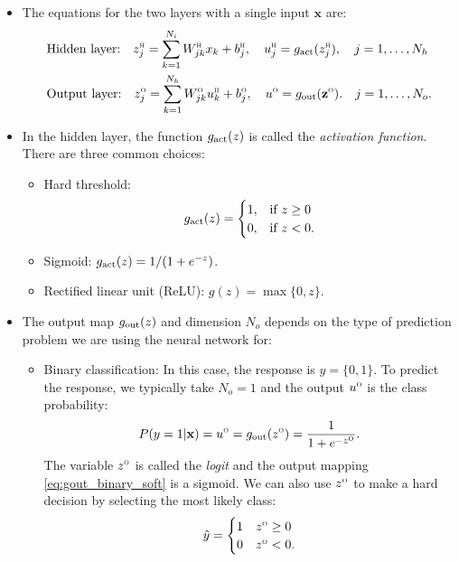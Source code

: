 \documentclass[11pt]{article}
\def\beq{\begin{equation}}
\def\eeq{\end{equation}}
\newcommand{\xbf}{\mathbf{x}}
\newcommand{\zbf}{\mathbf{z}}
\def\hid{\textsc{\tiny H}}
\def\out{\textsc{\tiny O}}
\def\zout{z^\out}
\begin{document}
\begin{itemize}
\item The equations for the two layers with a single input $\xbf$ are:
\begin{subequations} \label{eq:nn}
\begin{align}
    &\mbox{Hidden layer:} \quad
    z_{j}^\hid = \sum_{k=1}^{N_i} W^\hid_{jk}x_{k} + b^\hid_j, \quad
    u_{j}^\hid = g_{\rm act}(z_{j}^\hid), \quad j=1,\ldots,N_h
    \label{eq:nnhidden} \\
    &\mbox{Output layer:} \quad
    z_{j}^\out = \sum_{k=1}^{N_h} W^\out_{jk}u^\hid_{k} + b^\out_j,
    \quad
    u^\out = g_{\rm out}(\zbf^\out).
    \quad j=1,\ldots,N_o.
    \label{eq:nnout}
\end{align}
\end{subequations}

\item In the hidden layer, the function $g_{\rm act}(z)$ is called the \emph{activation function}.
There are three common choices:
\begin{itemize}
\item Hard threshold:
\beq \label{eq:gact_ht}
    g_{\rm act}(z) = \begin{cases}
        1, & \mbox{if } z \geq 0 \\
        0, & \mbox{if } z < 0.
        \end{cases}
\eeq
\item Sigmoid: $g_{\rm act}(z) = 1/(1+e^{-z})$.

\item Rectified linear unit (ReLU): $g(z) = \max\{0,z\}$.
\end{itemize}

\item The output map $g_{\rm out}(z)$ and dimension $N_o$
depends on the type of prediction problem we are using the neural
network for:
\begin{itemize}
\item Binary classification:  In this case, the response
is $y=\{0,1\}$.  To predict the response, we typically take $N_o = 1$ and
the output $u^\out$ is the class probability:
\beq \label{eq:gout_binary_soft}
    P(y=1|\xbf) = u^\out = g_{\rm out}(z^\out) = \frac{1}{1 + e^{-\zout}}.
\eeq
The variable $\zout$ is called the \emph{logit} and the output mapping \eqref{eq:gout_binary_soft}
is a sigmoid.
We can also use $\zout$ to make a hard decision by selecting the most likely class:
\beq \label{eq:gout_thresh}
    \hat{y} =  \begin{cases}
        1 & z^\out \geq 0 \\
        0 & z^\out < 0.
        \end{cases}
\eeq


\end{itemize}
\end{itemize}
\end{document}
